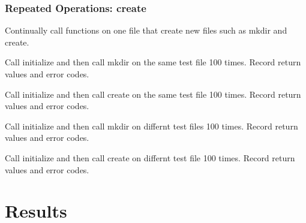 \documentclass[12pt]{article} %
\begin{document}
\subsubsection{Repeated Operations: create}
Continually call functions on one file that create new files such as mkdir and create.

\begin{list}{.}{}
\item Call initialize and then call mkdir on the same test file 100 times.  Record return values and error codes.
\item Call initialize and then call create on the same test file 100 times.  Record return values and error codes.
\item Call initialize and then call mkdir on differnt test files 100 times.  Record return values and error codes.
\item Call initialize and then call create on differnt test file 100 times.  Record return values and error codes.
\end{list}

\section{Results}
\end{document}
